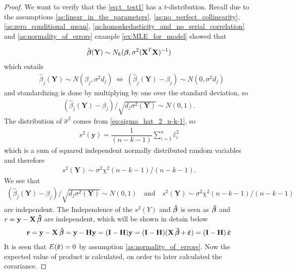 \begin{proof}
We want to verify that the \eqref{eq:t_test1} has a $t$-distribution. Recall due to the assumptions \ref{as:linear_in_the_parameters}, \ref{as:no_perfect_collinearity}, \ref{as:zero_conditional_mean}, \ref{as:homoskedasticity_and_no_serial_correlation} and \ref{as:normality_of_errors} example \ref{ex:MLE_for_model} showed that

\begin{align} \label{eq:th_t_test}
    \hat{\operatorname{\boldsymbol{\beta}}}(\textbf{Y}) \sim N_k(\operatorname{\boldsymbol{\beta}},\sigma^2(\textbf{X}^T\textbf{X})^{-1})
\end{align}
which entails
\begin{align*}
    &\hat{\beta}_j(\textbf{Y})\sim N(\beta_j , \sigma^2d_j) \
    \Leftrightarrow \  (\hat{\beta}_j(\textbf{Y})-\beta_j) \sim N(0,\sigma^2d_j)
\end{align*}
and standardizing is done by multiplying by one over the standard deviation, so
\begin{align*}
    (\hat{\beta}_j(\textbf{Y})-\beta_j)/\sqrt{d_j\sigma^2(\textbf{Y})} \sim N(0,1).
\end{align*}
The distribution of $\hat{\sigma}^2$ comes from \eqref{eq:sigma_hat_2_n-k-1}, so
\begin{align} \label{eq:sigma_square_of_Y}
    s^2(\textbf{y}) = \dfrac{1}{(n-k-1)}\sum_{i=1}^n \hat{\varepsilon}_i^2
\end{align}
which is a sum of squared independent normally distributed random variables and therefore
\begin{align*}
s^2(\textbf{Y}) \sim \sigma^2 \chi^2(n-k-1)/(n-k-1).    
\end{align*}
We see that
\begin{align*}
    (\hat{\beta}_j(\textbf{Y})-\beta_j)/\sqrt{d_j\sigma^2(\textbf{Y})} \sim N(0,1) \quad \text{and} \quad s^2(\textbf{Y}) \sim \sigma^2\chi^2 (n-k-1)/(n-k-1)
\end{align*}
are independent.
The Independence of the $s^2(Y)$ and $\operatorname{\boldsymbol{\hat{\beta}}}$ is seen as $\operatorname{\boldsymbol{\hat{\beta}}}$ and $r = \textbf{y} -\textbf{X} \operatorname{\boldsymbol{\hat{\beta}}}$ are independent, which will be shown in detain below
\begin{align*}
    \textbf{r} = \textbf{y}-\textbf{X} \operatorname{\boldsymbol{\hat{\beta}}} = \textbf{y} - \textbf{H} \textbf{y} = (\textbf{I}-\textbf{H})\textbf{y} = (\textbf{I}-\textbf{H}) (\textbf{X} \operatorname{\boldsymbol{\hat{\beta}}} + \operatorname{\hat{\boldsymbol{\varepsilon}}}) = (\textbf{I} - \textbf{H}) \operatorname{\hat{\boldsymbol{\varepsilon}}}
\end{align*}
It is seen that $E(\operatorname{\hat{\boldsymbol{\varepsilon}}}) = 0$ by assumption \ref{as:normality_of_errors}. Now the expected value of product is calculated, on order to later calculated the covariance.

\end{proof}
